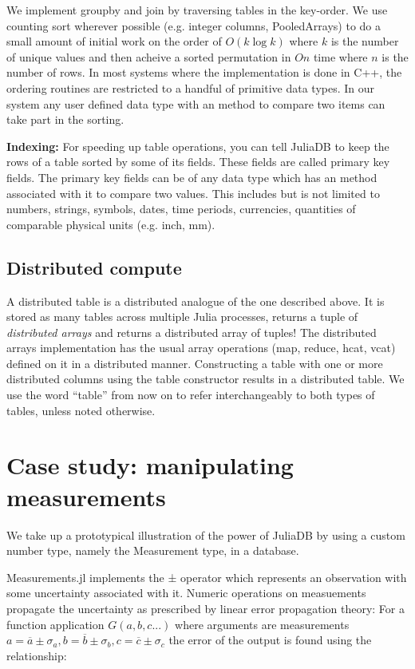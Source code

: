 \documentclass{juliacon}
\begin{document}
We implement groupby and join by traversing tables in the key-order. We use counting sort wherever possible (e.g. integer columns, PooledArrays) to do a small amount of initial work on the order of $O(k \log k)$ where $k$ is the number of unique values and then acheive a sorted permutation in $O n$ time where $n$ is the number of rows. In most systems where the implementation is done in C++, the ordering routines are restricted to a handful of primitive data types. In our system any user defined data type with an  method to compare two items can take part in the sorting.

\textbf{Indexing: }For speeding up table operations, you can tell
JuliaDB to keep the rows of a table sorted by some of its fields.
These fields are called primary key fields. The primary key fields
can be of any data type which has an  method associated
with it to compare two values. This includes but is not limited to
numbers, strings, symbols, dates, time periods, currencies, quantities
of comparable physical units (e.g. inch, mm).

\subsection{Distributed compute}

A distributed table is a distributed analogue of the one described
above. It is stored as many tables across multiple Julia processes,
 returns a tuple of \emph{distributed arrays} and
 returns a distributed array of tuples! The distributed
arrays implementation has the usual array operations (map, reduce,
hcat, vcat) defined on it in a distributed manner. Constructing a
table with one or more distributed columns using the table constructor
results in a distributed table. We use the word ``table'' from now on to refer interchangeably to both types of tables, unless
noted otherwise.

\section{Case study: manipulating measurements}
\label{sec:measurements}

We take up a prototypical illustration of the power of JuliaDB by using a custom number type, namely the Measurement type, in a database.

Measurements.jl implements the ± operator which represents an observation with some uncertainty associated with it. Numeric operations on measuements propagate the uncertainty as prescribed by linear error propagation theory: For a function application $G(a,b,c...)$ where arguments are measurements $a=\overline{a} \pm \sigma_{a}, b=\overline{b} \pm \sigma_{b}, c=\overline{c} \pm \sigma_{c}$ the error of the output is found using the relationship: 
\end{document}
